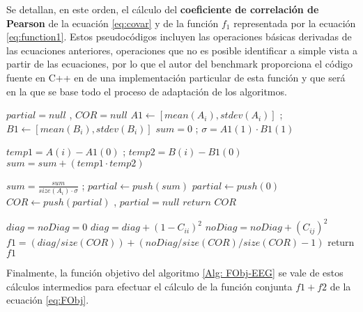 Se detallan, en este orden, el cálculo del \textbf{coeficiente de correlación de Pearson} de la ecuación \ref{eq:covar} y de la función $f_1$ representada por la ecuación \ref{eq:function1}. Estos pseudocódigos incluyen las operaciones básicas derivadas de las ecuaciones anteriores, operaciones que no es posible identificar a simple vista a partir de las ecuaciones, por lo que el autor del benchmark proporciona el código fuente en C++ en \cite{CompetitionBigOpt} de una implementación particular de esta función y que será en la que se base todo el proceso de adaptación de los algoritmos.

\begin{algorithm}[h]
	\begin{algorithmic}[1]
		\STATE $partial = null$ , $COR = null$
		\STATE $A1 \leftarrow [mean(A_i), stdev(A_i)]$ ; $B1 \leftarrow [mean(B_i), stdev(B_i)]$
		\STATE $sum = 0$ ; $\sigma = A1(1) \cdot B1(1)$
		
		
		\STATE $temp1 = A(i) -  A1(0)$ ; $temp2 = B(i) -  B1(0)$
		\STATE $sum = sum + (temp1 \cdot temp2)$					
		\ENDFOR
		
		\STATE $sum = \frac{sum}{size(A_i) \cdot \sigma}$ ; $partial \leftarrow push(sum)$
		\ELSE
		\STATE $partial \leftarrow push(0)$
		\ENDIF	
		\ENDFOR
		\STATE $COR \leftarrow push(partial)$ , $partial = null$
		\ENDFOR
		\STATE $return$ $COR$
	\end{algorithmic}
	\caption{: $COR = Covar(A, B)$  } \label{Alg: COVAR}
\end{algorithm}


\begin{algorithm}[h]
	\begin{algorithmic}[1]
		\STATE $diag = noDiag = 0$
		\STATE $diag = diag+ (1-C_{ii})^2$
		\ELSE
		\STATE $noDiag= noDiag + (C_{ij})^2$
		\ENDIF
		\ENDFOR
		\ENDFOR
		\STATE $f1 = (diag/ size(COR)) +  (noDiag/size(COR)/size(COR)-1)$
		\STATE return $f1$
		
	\end{algorithmic}
	\caption{: $f1 = Diagonals(COR)$  } \label{Alg: Function1-EEG}
\end{algorithm}

Finalmente, la función objetivo del algoritmo \ref{Alg: FObj-EEG} se vale de estos cálculos intermedios para efectuar el cálculo de la función conjunta $f1 + f2$ de la ecuación \ref{eq:FObj}.


